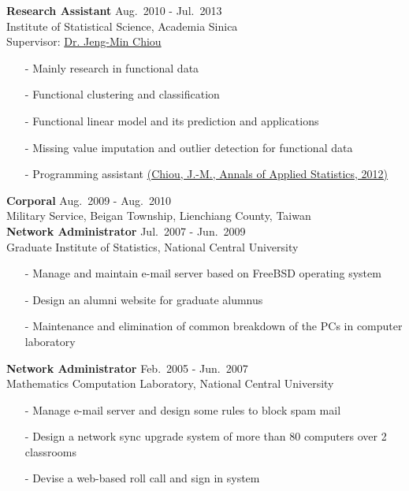 \documentclass[a4paper,10pt,dvipdfmx]{article}
\begin{document}
\indent \textbf{Research Assistant} \hfill Aug.~2010 - Jul.~2013\\
\indent Institute of Statistical Science, Academia Sinica\\
\indent Supervisor: \href{http://www.stat.sinica.edu.tw/jmchiou/}{Dr. Jeng-Min Chiou}
\begin{itemize}[noitemsep,nolistsep,leftmargin=12mm]
  \item[-] Mainly research in functional data
  \item[-] Functional clustering and classification
  \item[-] Functional linear model and its prediction and applications
  \item[-] Missing value imputation and outlier detection for functional data
  \item[-] Programming assistant \href{https://projecteuclid.org/euclid.aoas/1356629052/}{(Chiou, J.-M., Annals of Applied Statistics, 2012)}\\
\end{itemize}

\indent \textbf{Corporal} \hfill Aug.~2009 - Aug.~2010\\
\indent Military Service, Beigan Township, Lienchiang County, Taiwan\\

\indent \textbf{Network Administrator} \hfill Jul.~2007 - Jun.~2009\\
\indent Graduate Institute of Statistics, National Central University
\begin{itemize}[noitemsep,nolistsep,leftmargin=12mm]
  \item[-] Manage and maintain e-mail server based on FreeBSD operating system
  \item[-] Design an alumni website for graduate alumnus
  \item[-] Maintenance and elimination of common breakdown of the PCs in computer laboratory\\
\end{itemize}

\indent \textbf{Network Administrator} \hfill Feb.~2005 - Jun.~2007\\
\indent Mathematics Computation Laboratory, National Central University
\begin{itemize}[noitemsep,nolistsep,leftmargin=12mm]
  \item[-] Manage e-mail server and design some rules to block spam mail
  \item[-] Design a network sync upgrade system of more than 80 computers over 2 classrooms
  \item[-] Devise a web-based roll call and sign in system\\
\end{itemize}
\end{document}
